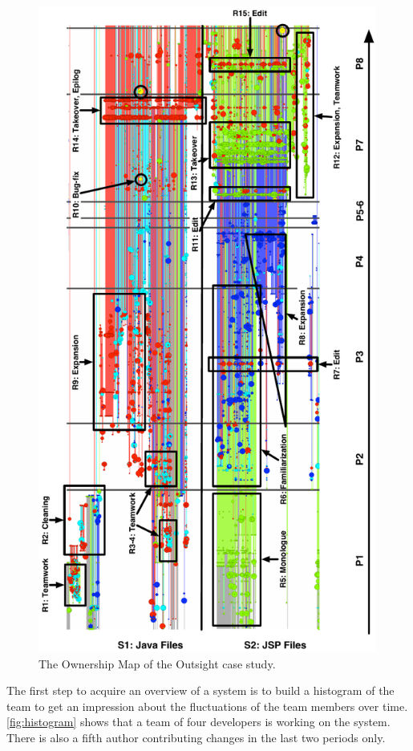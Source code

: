 \begin{figure}[htbp]
\begin{center}
\includegraphics[height=21.3cm]{fig/chronia-outsight}
\caption{The Ownership Map of the Outsight case study.}
\label{fig:casestudy-outsight}
\end{center}
\end{figure}

The first step to acquire an overview of a system is to build a histogram of the team to get an impression about the fluctuations of the team members over time. \autoref{fig:histogram} shows that a team of four developers is working on the system. There is also a fifth author contributing changes in the last two periods only.

